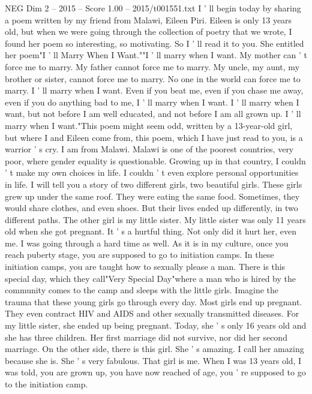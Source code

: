 \begin{textsample}{NEG Dim 2 – 2015 – Score 1.00 – 2015/t001551.txt}  \label{ex:f2_neg_039}
I ' ll begin today by sharing a poem written by my friend from Malawi, Eileen Piri.
Eileen is only 13 years old, but when we were going through the collection of poetry that we wrote, I found her poem so interesting, so motivating.
So I ' ll read it to you.
She entitled her poem"I ' ll Marry When I Want.""I ' ll marry when I want.
My mother can ' t force me to marry.
My father cannot force me to marry.
My uncle, my aunt, my brother or sister, cannot force me to marry.
No one in the world can force me to marry.
I ' ll marry when I want.
Even if you beat me, even if you chase me away, even if you do anything bad to me, I ' ll marry when I want.
I ' ll marry when I want, but not before I am well educated, and not before I am all grown up.
I ' ll marry when I want."This poem might seem odd, written by a 13-year-old girl, but where I and Eileen come from, this poem, which I have just read to you, is a warrior ' s cry.
I am from Malawi.
Malawi is one of the poorest countries, very poor, where gender equality is questionable.
Growing up in that country, I couldn ' t make my own choices in life.
I couldn ' t even explore personal opportunities in life.
I will tell you a story of two different girls, two beautiful girls.
These girls grew up under the same roof.
They were eating the same food.
Sometimes, they would share clothes, and even shoes.
But their lives ended up differently, in two different paths.
The other girl is my little sister.
My little sister was only 11 years old when she got pregnant.
It ' s a hurtful thing.
Not only did it hurt her, even me.
I was going through a hard time as well.
As it is in my culture, once you reach puberty stage, you are supposed to go to initiation camps.
In these initiation camps, you are taught how to sexually please a man.
There is this special day, which they call"Very Special Day"where a man who is hired by the community comes to the camp and sleeps with the little girls.
Imagine the trauma that these young girls go through every day.
Most girls end up pregnant.
They even contract HIV and AIDS and other sexually transmitted diseases.
For my little sister, she ended up being pregnant.
Today, she ' s only 16 years old and she has three children.
Her first marriage did not survive, nor did her second marriage.
On the other side, there is this girl.
She ' s amazing.
I call her amazing because she is.
She ' s very fabulous.
That girl is me.
When I was 13 years old, I was told, you are grown up, you have now reached of age, you ' re supposed to go to the initiation camp.

\end{textsample}
